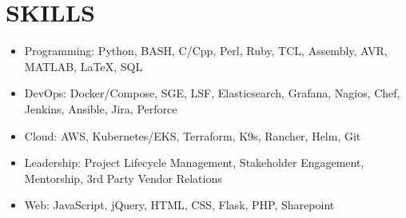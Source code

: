 \documentclass[line,margin]{res}
\begin{document}
\begin{resume}
\begin{adjustwidth}{-115pt}{0pt}

\end{adjustwidth}

\section{SKILLS}
\vspace{25px}
\begin{adjustwidth}{-115pt}{0pt}
	\begin{itemize}
		\item Programming: Python, BASH, C/Cpp, Perl, Ruby, TCL, Assembly, AVR, MATLAB, \LaTeX, SQL
		\item DevOps: Docker/Compose, SGE, LSF, Elasticsearch, Grafana, Nagios, Chef, Jenkins, Ansible, Jira, Perforce
		\item Cloud: AWS, Kubernetes/EKS, Terraform, K9s, Rancher, Helm, Git
		\item Leadership: Project Lifecycle Management,  Stakeholder Engagement,  Mentorship,  3rd Party Vendor Relations
		\item Web: JavaScript, jQuery, HTML, CSS, Flask, PHP, Sharepoint
	\end{itemize}
\end{adjustwidth}


\end{resume}
\end{document}
